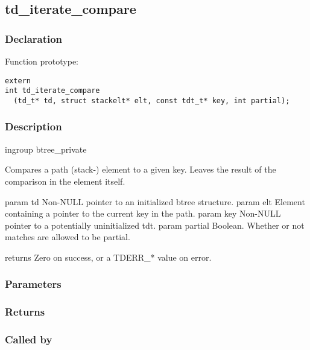 
\newpage
\subsection{td\_iterate\_compare}
\subsubsection{Declaration} Function prototype:

\begin{verbatim}
extern
int td_iterate_compare
  (td_t* td, struct stackelt* elt, const tdt_t* key, int partial);
\end{verbatim}

\subsubsection{Description}


 ingroup btree\_private

 Compares a path (stack-) element to a given key.
 Leaves the result of the comparison in the element itself.

 param td Non-NULL pointer to an initialized btree structure.
 param elt Element containing a pointer to the current key in the path.
 param key Non-NULL pointer to a potentially uninitialized tdt.
 param partial Boolean. Whether or not matches are allowed to be partial.

 returns Zero on success, or a TDERR\_* value on error.
 

\subsubsection{Parameters}
\subsubsection{Returns}
\subsubsection{Called by}
